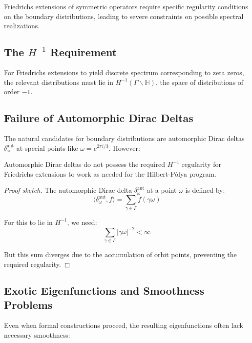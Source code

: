 Friedrichs extensions of symmetric operators require specific regularity conditions on the boundary distributions, leading to severe constraints on possible spectral realizations.

\subsection{The \texorpdfstring{$H^{-1}$}{H\^{}\{-1\}} Requirement}

\begin{theorem}
For Friedrichs extensions to yield discrete spectrum corresponding to zeta zeros, the relevant distributions must lie in $H^{-1}(\Gamma \backslash \mathbb{H})$, the space of distributions of order $-1$.
\end{theorem}

\subsection{Failure of Automorphic Dirac Deltas}

The natural candidates for boundary distributions are automorphic Dirac deltas $\delta^{\text{aut}}_\omega$ at special points like $\omega = e^{2\pi i/3}$. However:

\begin{proposition}
Automorphic Dirac deltas do not possess the required $H^{-1}$ regularity for Friedrichs extensions to work as needed for the Hilbert-P\'olya program.
\end{proposition}

\begin{proof}[Proof sketch]
The automorphic Dirac delta $\delta^{\text{aut}}_\omega$ at a point $\omega$ is defined by:
$$\langle \delta^{\text{aut}}_\omega, f \rangle = \sum_{\gamma \in \Gamma} f(\gamma \omega)$$

For this to lie in $H^{-1}$, we need:
$$\sum_{\gamma \in \Gamma} |\gamma \omega|^{-2} < \infty$$

But this sum diverges due to the accumulation of orbit points, preventing the required regularity.
\end{proof}

\subsection{Exotic Eigenfunctions and Smoothness Problems}

Even when formal constructions proceed, the resulting eigenfunctions often lack necessary smoothness:

